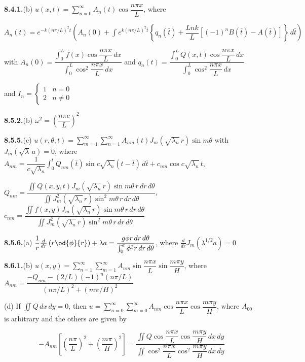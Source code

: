\medskip
\textbf{8.4.1.}\quad (b) $u(x,t) = \sum_{n=0}^{\infty}A_n(t)\cos\dfrac{n\pi x}{L}$, where

$A_n(t) = e^{-k(n\pi/L)^2t}\left(A_n(0) + \int e^{k(n\pi/L)^2\bar t}\left\{q_n(\bar t) + \dfrac{Lnk}{L}\left[(-1)^n B(\bar t)-A(\bar t)\right]\right\}\,d\bar t\right)$

with $A_n(0) = \dfrac{\int_0^L f(x)\cos\dfrac{n\pi x}{L}\,dx}{\int_0^L\cos^2\dfrac{n\pi x}{L}\,dx}$ and $q_n(t) = \dfrac{\int_0^L Q(x,t)\cos\dfrac{n\pi x}{L}\,dx}{\int_0^L\cos^2\dfrac{n\pi x}{L}\,dx}$

and $I_n = \begin{cases} 1 & n=0 \\ 2 & n \neq 0 \end{cases}$

\medskip
\textbf{8.5.2.}\quad (b) $\omega^2 = \left(\dfrac{n\pi c}{L}\right)^2$

\medskip
\textbf{8.5.5.}\quad (c) $u(r,\theta,t) = \sum_{m=1}^{\infty}\sum_{n=1}^{\infty}A_{nm}(t)J_m(\sqrt{\lambda_n}\,r)\sin m\theta$ with $J_m(\sqrt{\lambda}\,a) = 0$,
where $A_{nm} = \dfrac{1}{c\sqrt{\lambda_n}}\int_0^t Q_{nm}(\bar t)\sin c\sqrt{\lambda_n}(t-\bar t)\,d\bar t + c_{nm}\cos c\sqrt{\lambda_n}\,t$,

$Q_{nm} = \dfrac{\iint Q(x,y,t)J_m(\sqrt{\lambda_n}\,r)\sin m\theta\,r\,dr\,d\theta}{\iint J_m^2(\sqrt{\lambda_n}\,r)\sin^2 m\theta\,r\,dr\,d\theta}$,\quad $c_{nm} = \dfrac{\iint f(x,y)J_m(\sqrt{\lambda_n}\,r)\sin m\theta\,r\,dr\,d\theta}{\iint J_m^2(\sqrt{\lambda_n}\,r)\sin^2 m\theta\,r\,dr\,d\theta}$

\medskip
\textbf{8.5.6.}\quad (a) $\dfrac{1}{r}\frac{d}{d r}\left(r\od{\phi}{r}\right)+\lambda a = \dfrac{g\phi r\,dr\,d\theta}{\int_0^a\phi^2 r\,dr\,d\theta}$, where $\frac{d}{d r}J_m(\lambda^{1/2}a) = 0$%

\medskip
\textbf{8.6.1.}\quad (b) $u(x,y) = \sum_{n=1}^{\infty}\sum_{m=1}^{\infty}A_{nm}\sin\dfrac{n\pi x}{L}\sin\dfrac{m\pi y}{H}$, where
$A_{nm} = \dfrac{-Q_{nm}-(2/L)(-1)^n(n\pi/L)}{(n\pi/L)^2+(m\pi/H)^2}$

\quad (d) If $\iint Q\,dx\,dy = 0$, then $u = \sum_{n=0}^{\infty}\sum_{m=0}^{\infty}A_{nm}\cos\dfrac{n\pi x}{L}\cos\dfrac{m\pi y}{H}$, where
$A_{00}$ is arbitrary and the others are given by

\[
-A_{nm}\left[\left(\dfrac{n\pi}{L}\right)^2+\left(\dfrac{m\pi}{H}\right)^2\right] = \dfrac{\iint Q\cos\dfrac{n\pi x}{L}\cos\dfrac{m\pi y}{H}\,dx\,dy}{\iint\cos^2\dfrac{n\pi x}{L}\cos^2\dfrac{m\pi y}{H}\,dx\,dy}
\]


